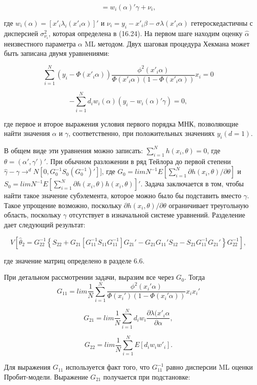 \[
=w_i(\alpha)'\gamma+\nu_i,
\]

где $w_{i}(\alpha)={[{x'}_i\lambda_i({x'}_i\alpha)]}'$ и $\nu_i=y_i-{x'}_i\beta-\sigma\lambda({x'}_i\alpha)$ гетероскедастичны с дисперсией $\sigma^2_{\nu_i}$, которая определена в (16.24). На первом шаге находим оценку $\hat{\alpha}$ неизвестного параметра $\alpha$ ML методом. Двух шаговая процедура Хекмана может быть записана двумя уравнениями:

\begin{equation}
\sum_{i=1}^N(y_i-\Phi({x'}_i\alpha))
\frac{\phi^2({x'}_i\alpha)}{\Phi({x'}_i\alpha)(1-\Phi({x'}_i\alpha))}x_{i}=0
\end{equation}


\[
-\sum_{i=1}^N d_iw_i(\alpha)(y_i-w_i(\alpha)'\gamma) =0,
\]

где первое и второе выражения условия первого порядка МНК, позволяющие найти значения $\alpha$ и $\gamma$, соответственно, при положительных значениях $y_{i}(d=1)$.

В общем виде эти уравнения можно записать: $\sum_{i=1}^Nh(x_i,\theta)=0$, где $\theta=(\alpha',\gamma')'$. При обычном разложении в ряд Тейлора до первой степени $\hat{\gamma}-\gamma{\to}^dN[0,G^{-1}_0S_0(G^{-1}_0)']]$, где $G_0=limN^{-1}E[\sum_{i=1}^N\partial h(x_i,\theta)/\partial\theta]$ и $S_0=limN^{-1}E[\sum_{i=1}^N\partial h(x_i,\theta)h(x_i,\theta)]'$. Задача заключается в том, чтобы найти такое значение субэлемента, которое можно было бы подставить вместо $\gamma$. Такое упрощение возможно, поскольку $\partial h(x_i,\theta)/\partial\theta$ ограничивает треугольную область, поскольку $\gamma$ отсутствует в изначальной системе уравнений. Разделение дает следующий результат:

\[
V[\hat{\theta}_2=G_22^{-1}\left\lbrace S_22+G_21[G_11^{-1}S_11G_11^{-1}]G_21'-G_{21}G_{11}'S_{12}-S_{21}G_{11}^{-1}G_{21}'\right\rbrace{G_{22}^{-1}}],
\]

где значение матриц определено в разделе 6.6.

При детальном рассмотрении задачи, выразим все через $G_0$. Тогда
\[
G_{11}=lim\dfrac{1}{N}\sum_{i=1}^N \dfrac{\phi^2(x_i'\alpha)}{\Phi(x_i')(1-\Phi(x_i'\alpha))}x_ix_i'
\]

\[
G_{21}=lim\dfrac{1}{N}\sum_{i=1}^N d_iw_i\dfrac{\partial\lambda(x'_{i}\alpha}{\partial\alpha},
\]

\[
G_{22}=lim\dfrac{1}{N}\sum_{i=1}^N E[d_{i}w_iw'_i].
\]

Для выражения $G_11$ используется факт того, что $G^{-1}_{11}$ равно дисперсии ML оценки Пробит-модели. Выражение $G_{21}$ получается при подстановке: 

